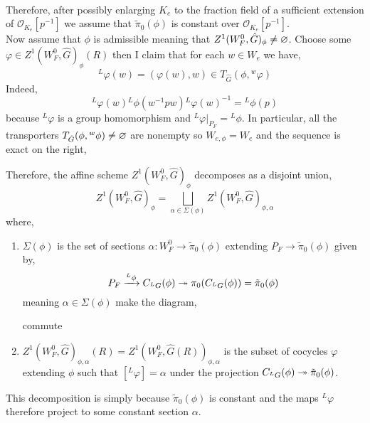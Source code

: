 \documentclass[12pt]{article}
\newcommand{\LG}{{}^L G}
\newcommand{\ok}{\mathcal{O}_{K_e}}
\begin{document}
\bigskip\\
Therefore, after possibly enlarging $K_e$ to the fraction field of a sufficient \etale extension of $\ok[p^{-1}]$ we assume that $\tilde{\pi}_0(\phi)$ is constant over $\ok[p^{-1}]$. 
\bigskip\\
Now assume that $\phi$ is admissible meaning that $Z^1(W^0_F, \hat{G})_\phi \neq \varnothing$. Choose some $\varphi \in Z^1(W^0_F, \hat{G})_\phi(R)$ then I claim that for each $w \in W_e$ we have,
\[ {}^L \varphi(w) = (\varphi(w), w) \in T_{\hat{G}}(\phi, {}^w \varphi) \]
Indeed,
\[ {}^L \varphi(w) {}^L \phi(w^{-1} p w) {}^L \varphi(w)^{-1} = {}^L \phi(p) \]
because ${}^L \varphi$ is a group homomorphism and ${}^L \varphi|_{P_F} = {}^L \phi$. In particular, all the transporters $T_{\hat{G}}(\phi, {}^w \phi) \neq \varnothing$ are nonempty so $W_{e, \phi} = W_e$ and the sequence is exact on the right,
\begin{center}
\end{center}
Therefore, the affine scheme $Z^1(W^0_F, \hat{G})_\phi$ decomposes as a disjoint union,
\[ Z^1(W^0_F, \hat{G})_\phi = \bigsqcup_{\alpha \in \Sigma(\phi)} Z^1(W^0_F, \hat{G})_{\phi, \alpha} \]
where,
\begin{enumerate}
\item $\Sigma(\phi)$ is the set of sections $\alpha : W_F^0 \to \tilde{\pi}_0(\phi)$ extending $P_F \to \tilde{\pi}_0(\phi)$ given by,
\[ P_F \xrightarrow{{}^L \phi} C_{\LG}(\phi) \onto \pi_0(C_{\LG}(\phi)) = \tilde{\pi}_0(\phi) \]
meaning $\alpha \in \Sigma(\phi)$ make the diagram,
\begin{center}
\end{center}
commute
\item $Z^1(W^0_F, \hat{G})_{\phi, \alpha}(R) = Z^1(W^0_F, \hat{G}(R))_{\phi, \alpha}$ is the subset of cocycles $\varphi$ extending $\phi$ such that $[{}^L \varphi] = \alpha$ under the projection $C_{\LG}(\phi) \onto \tilde{\pi}_0(\phi)$. 
\end{enumerate}
This decomposition is simply because $\tilde{\pi}_0(\phi)$ is constant and the maps ${}^L \varphi$ therefore project to some constant section $\alpha$. 
\end{document}
